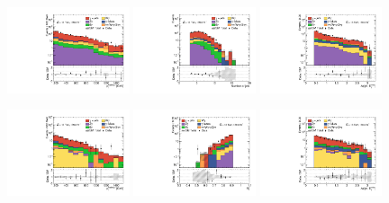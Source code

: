 \begin{figure}[ht!]
  \centering

    \includegraphics[width=0.32\textwidth]{images/results/fr2_unblind/can_VRQ_ph_pt0_afterFit.pdf}
    \includegraphics[width=0.32\textwidth]{images/results/fr2_unblind/can_VRQ_jet_n_afterFit.pdf}
    \includegraphics[width=0.32\textwidth]{images/results/fr2_unblind/can_VRQ_dphi_jetmet_afterFit.pdf}

    \includegraphics[width=0.32\textwidth]{images/results/fr2_unblind/can_VRM1L_ph_pt0_afterFit.pdf}
    \includegraphics[width=0.32\textwidth]{images/results/fr2_unblind/can_VRM1L_rt4_afterFit.pdf}
    \includegraphics[width=0.32\textwidth]{images/results/fr2_unblind/can_VRM1L_dphi_jetmet_afterFit.pdf}


\end{figure}
